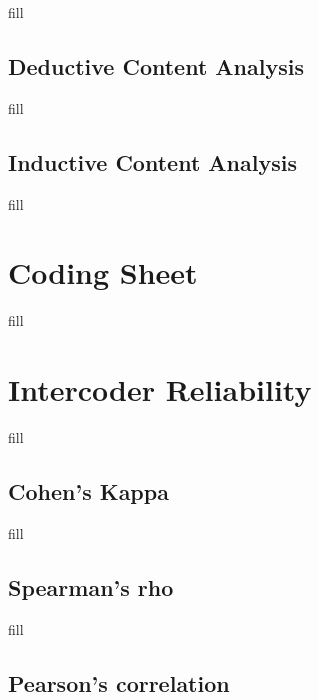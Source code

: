 \documentclass[
  b5paper]{book}
\begin{document}
fill

\hypertarget{deductive-content-analysis}{%
\subsection*{Deductive Content Analysis}\label{deductive-content-analysis}}

fill

\hypertarget{inductive-content-analysis}{%
\subsection*{Inductive Content Analysis}\label{inductive-content-analysis}}

fill

\hypertarget{coding-sheet}{%
\section{Coding Sheet}\label{coding-sheet}}

fill

\hypertarget{intercoder-reliability}{%
\section{Intercoder Reliability}\label{intercoder-reliability}}

fill

\hypertarget{cohens-kappa}{%
\subsection*{Cohen's Kappa}\label{cohens-kappa}}

fill

\hypertarget{spearmans-rho}{%
\subsection*{Spearman's rho}\label{spearmans-rho}}

fill

\hypertarget{pearsons-correlation}{%
\subsection*{Pearson's correlation}\label{pearsons-correlation}}
\end{document}
